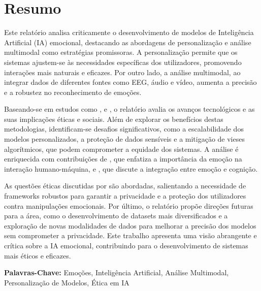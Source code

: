 \documentclass[a4paper,12pt]{report}
\begin{document}
	
	\newpage
	\thispagestyle{empty}
	\mbox{}
	\newpage
	
	
	\section*{Resumo}
	
	Este relatório analisa criticamente o desenvolvimento de modelos de Inteligência Artificial (IA) emocional, destacando as abordagens de personalização e análise multimodal como estratégias promissoras. A personalização permite que os sistemas ajustem-se às necessidades específicas dos utilizadores, promovendo interações mais naturais e eficazes. Por outro lado, a análise multimodal, ao integrar dados de diferentes fontes como EEG, áudio e vídeo, aumenta a precisão e a robustez no reconhecimento de emoções.
	
	Baseando-se em estudos como \textcite{kargarandehkordi2024}, \textcite{gursesli2024} e \textcite{lee2024}, o relatório avalia os avanços tecnológicos e as suas implicações éticas e sociais. Além de explorar os benefícios destas metodologias, identificam-se desafios significativos, como a escalabilidade dos modelos personalizados, a proteção de dados sensíveis e a mitigação de vieses algorítmicos, que podem comprometer a equidade dos sistemas. A análise é enriquecida com contribuições de \textcite{picard1997}, que enfatiza a importância da emoção na interação humano-máquina, e \textcite{pessoa2013}, que discute a integração entre emoção e cognição.
	
	As questões éticas discutidas por \textcite{mueller2020} são abordadas, salientando a necessidade de frameworks robustos para garantir a privacidade e a proteção dos utilizadores contra manipulações emocionais. Por último, o relatório propõe direções futuras para a área, como o desenvolvimento de datasets mais diversificados e a exploração de novas modalidades de dados para melhorar a precisão dos modelos sem comprometer a privacidade. Este trabalho apresenta uma visão abrangente e crítica sobre a IA emocional, contribuindo para o desenvolvimento de sistemas mais éticos e eficazes.
	
	\vspace{4em}
	
	\noindent\textbf{Palavras-Chave:} \normalsize{Emoções, Inteligência Artificial, Análise Multimodal, Personalização de Modelos, Ética em IA}
	
\end{document}
